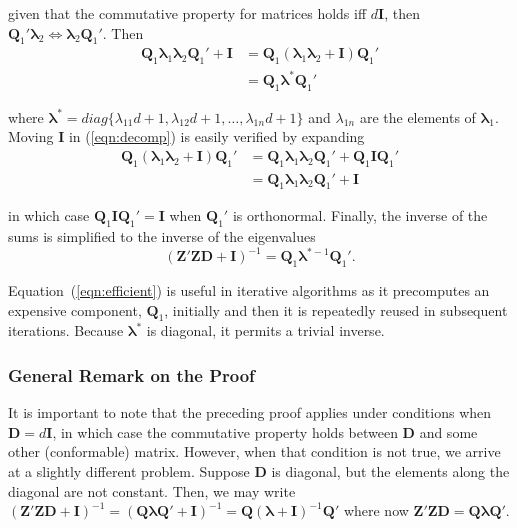 \documentclass[12pt]{article}
\begin{document}
\noindent given that the commutative property for matrices holds iff $d\bm{I}$, then $\bm{Q}_1'\bm{\lambda}_2 \Longleftrightarrow \bm{\lambda}_2\bm{Q}_1'$. Then
\begin{align}
\bm{Q}_1 \bm{\lambda}_1\bm{\lambda}_2 \bm{Q}_1' + \bm{I}	&= \bm{Q}_1 (\bm{\lambda}_1\bm{\lambda}_2+ \bm{I}) \bm{Q}_1' \label{eqn:decomp}\\
		&= \bm{Q}_1 \bm{\lambda}^* \bm{Q}_1'
\end{align}

\noindent where $\bm{\lambda}^* = diag\{\lambda_{11}d+1, \lambda_{12}d+1, \ldots, \lambda_{1n}d+1\}$ and $\lambda_{1n}$ are the elements of $\bm{\lambda}_1$. Moving $\bm{I}$ in (\ref{eqn:decomp}) is easily verified by expanding
\begin{align}
\bm{Q}_1 (\bm{\lambda}_1\bm{\lambda}_2 + \bm{I}) \bm{Q}_1' &= \bm{Q}_1 \bm{\lambda}_1\bm{\lambda}_2\bm{Q}_1' + \bm{Q}_1\bm{I}\bm{Q}_1'\\
		&=\bm{Q}_1 \bm{\lambda}_1\bm{\lambda}_2\bm{Q}_1' + \bm{I}
\end{align}

\noindent in which case $\bm{Q}_1\bm{I}\bm{Q}_1'=\bm{I}$ when $\bm{Q}_1'$ is orthonormal. Finally, the inverse of the sums is simplified to the inverse of the eigenvalues 
\begin{equation}
\label{eqn:efficient}
(\bm{Z}'\bm{Z}\bm{D} + \bm{I})^{-1} = \bm{Q}_1 \bm{\lambda}^{*-1} \bm{Q}_1'.
\end{equation}

Equation~(\ref{eqn:efficient}) is useful in iterative algorithms as it precomputes an expensive component, $\bm{Q}_1$, initially and then it is repeatedly reused in subsequent iterations. Because $\bm{\lambda}^*$ is diagonal, it permits a trivial inverse. 

\subsubsection*{General Remark on the Proof}
It is important to note that the preceding proof applies under conditions when $\bm{D}=d\bm{I}$, in which case the commutative property holds between $\bm{D}$ and some other (conformable) matrix. However, when that condition is not true, we arrive at a slightly different problem. Suppose $\bm{D}$ is diagonal, but the elements along the diagonal are not constant. Then, we may write $(\bm{Z}'\bm{Z}\bm{D} + \bm{I})^{-1} = (\bm{Q} \bm{\lambda} \bm{Q}' + \bm{I})^{-1} = \bm{Q} (\bm{\lambda}+\bm{I})^{-1} \bm{Q}'$ where now $\bm{Z}'\bm{Z}\bm{D} = \bm{Q} \bm{\lambda} \bm{Q}'$.
\end{document}
